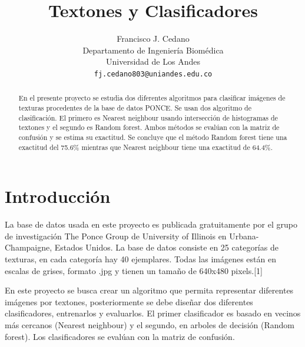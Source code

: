 \documentclass[10pt,twocolumn,letterpaper]{article}
\begin{document}
\title{Textones y Clasificadores}

\author{Francisco J. Cedano\\
Departamento de Ingenier\'ia Biom\'edica\\
Universidad de Los Andes\\
{\tt\small fj.cedano803@uniandes.edu.co}
}%


\maketitle

\begin{abstract}
   En el presente proyecto se estudia dos diferentes algoritmos para clasificar imágenes de texturas procedentes de la base de datos PONCE. Se usan dos algoritmo de clasificación. El primero es Nearest neighbour usando intersección de histogramas de textones y el segundo es Random forest. Ambos métodos se evalúan con la matriz de confusión y se estima su exactitud. Se concluye que el método Random forest tiene una exactitud del 75.6\% mientras que Nearest neighbour tiene una exactitud de 64.4\%. 
   
\end{abstract}

\section{Introducción}

La base de datos usada en este proyecto es publicada gratuitamente por el grupo de investigación The Ponce Group de University of Illinois en Urbana-Champaigne, Estados Unidos. La base de datos consiste en 25 categorías de texturas, en cada categoría hay 40 ejemplares. Todas las imágenes están en escalas de grises, formato .jpg y tienen un tamaño de 640x480 pixels.[1]

En este proyecto se busca crear un algoritmo que permita representar diferentes imágenes por textones, posteriormente se debe diseñar dos diferentes clasificadores, entrenarlos y evaluarlos. El primer clasificador es basado en vecinos más cercanos (Nearest neighbour) y el segundo, en arboles de decisión (Random forest). Los clasificadores se evalúan con la matriz de confusión. 
\end{document}
